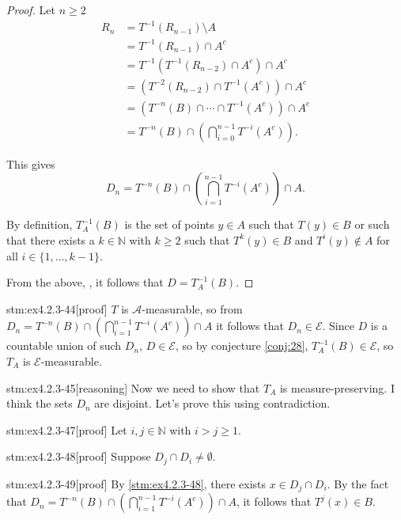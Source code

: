 \begin{proof}
Let $n \ge 2$
\begin{align*}
R_n &= T^{-1}(R_{n-1}) \setminus A \\
&= T^{-1}(R_{n-1}) \cap A^c \\
&= T^{-1}(T^{-1}(R_{n-2}) \cap A^c) \cap A^c \\
&= (T^{-2}(R_{n-2}) \cap T^{-1}(A^c)) \cap A^c \\
&= (T^{-n}(B) \cap \cdots \cap T^{-1}(A^c)) \cap A^c \\
&= T^{-n}(B) \cap \left( \bigcap_{i=0}^{n-1} T^{-i}(A^c) \right).
\end{align*}

This gives
\[
D_n = T^{-n}(B) \cap \left( \bigcap_{i=1}^{n-1} T^{-i}(A^c) \right) \cap A.
\]

By definition, $T_A^{-1}(B)$ is the set of points $y \in A$ such that $T(y) \in B$ or such that there exists a $k \in \mathbb{N}$ with $k \ge 2$ such that $T^k(y) \in B$ and $T^i(y) \notin A$ for all $i \in \{1, \ldots, k-1\}$.

From the above, , it follows that $D = T_A^{-1}(B)$.
\end{proof}

\begin{stm}{stm:ex4.2.3-44}[proof]
$T$ is $\mathcal{A}$-measurable, so from $D_n = T^{-n}(B) \cap \left( \bigcap_{i=1}^{n-1} T^{-i}(A^c) \right) \cap A$ it follows that $D_n \in \mathcal{E}$. Since $D$ is a countable union of such $D_n$, $D \in \mathcal{E}$, so by conjecture \ref{conj:28}, $T_A^{-1}(B) \in \mathcal{E}$, so $T_A$ is $\mathcal{E}$-measurable.
\end{stm}

\begin{stm}{stm:ex4.2.3-45}[reasoning]
Now we need to show that $T_A$ is measure-preserving. I think the sets $D_n$ are disjoint. Let's prove this using contradiction.
\end{stm}

\begin{stm}{stm:ex4.2.3-47}[proof]
Let $i, j \in \mathbb{N}$ with $i > j \ge 1$.
\end{stm}

\begin{stm}{stm:ex4.2.3-48}[proof]
Suppose $D_j \cap D_i \ne \emptyset$.
\end{stm}

\begin{stm}{stm:ex4.2.3-49}[proof]
By \ref{stm:ex4.2.3-48}, there exists $x \in D_j \cap D_i$. By the fact that $D_n = T^{-n}(B) \cap \left( \bigcap_{i=1}^{n-1} T^{-i}(A^c) \right) \cap A$, it follows that $T^j(x) \in B$.  
\end{stm}

